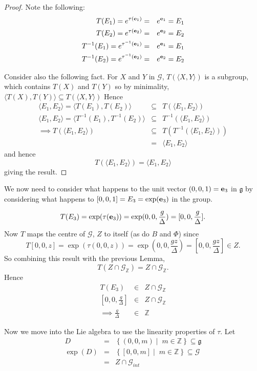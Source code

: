 \documentclass[honours]{UNSWthesis}
\newcommand{\Z}{\mathbb{Z}}
\newcommand{\G}{\mathcal{G}}
\newcommand{\g}{\mathfrak{g}}
\newcommand{\1}{\mathbf{e}_{1}}
\newcommand{\2}{\mathbf{e}_{3}}
\newcommand{\3}{\mathbf{e}_{3}}
\begin{document}
\begin{proof}
Note the following:
\begin{eqnarray*}
T(E_{1})= e^{\tau ({\bf e}_{1})} &=& e^{{\bf e}_{1}} = E_{1} \\
T(E_{2})= e^{\tau ({\bf e}_{2})} &=& e^{{\bf e}_{2}} = E_{2} \\
T^{-1}(E_{1})= e^{\tau^{-1} ({\bf e}_{1})} &=& e^{{\bf e}_{1}} = E_{1} \\
T^{-1}(E_{2})= e^{\tau^{-1} ({\bf e}_{2})} &=& e^{{\bf e}_{2}} = E_{2} 
\end{eqnarray*}

Consider also the following fact. For $X$ and $Y$ in $\G$, $T( \langle X,Y \rangle )$ is a subgroup, which contains $T(X)$ and $T(Y)$ so by minimality, $\langle T(X),T(Y) \rangle \subseteq T( \langle X,Y \rangle )$
Hence
\begin{eqnarray*}
\langle E_{1},E_{2} \rangle = \langle T(E_{1}),T(E_{2}) \rangle &\subseteq & T( \langle E_{1},E_{2} \rangle) \\
\langle E_{1},E_{2} \rangle = \langle T^{-1}(E_{1}),T^{-1}(E_{2}) \rangle & \subseteq & T^{-1}( \langle E_{1},E_{2} \rangle) \\
\implies T( \langle E_{1},E_{2} \rangle) & \subseteq & T(T^{-1}( \langle E_{1},E_{2} \rangle))\\
&=&\langle E_{1},E_{2} \rangle
\end{eqnarray*}
and hence 
\[
T( \langle E_{1},E_{2} \rangle)= \langle E_{1},E_{2}\rangle
\]
giving the result.
\end{proof}

We now need to consider what happens to the unit vector $(0,0,1)={\bf e}_{3}$ in $\g$ by considering what happens to $[0,0,1]=E_{3}=\exp({\bf e}_{3})$ in the group.

\[
T(E_{3})= \exp(\tau ({\bf e}_{3}))=\exp(0,0,\frac{g}{\Delta})=[0,0,\frac{g}{\Delta}].
\]
Now $T$ maps the centre of $\G$, $Z$ to itself (as do $B$ and $\Phi$) since 
\[
T[0,0,z]= \exp(\tau(0,0,z))= \exp(0,0,\frac{gz}{\Delta})=[0,0,\frac{gz}{\Delta}] \in Z
.\] So combining this result with the previous Lemma,
\[
T( Z \cap \G_{\Z})=Z \cap \G_{\Z}
.\]
Hence 
\begin{eqnarray*}
T(E_{3}) &\in & Z \cap \G_{\Z} \\
\left[ 0,0,\frac{g}{\Delta} \right] &\in & Z \cap \G_{\Z} \\
\implies \frac{g}{\Delta} &\in & \Z
\end{eqnarray*}

Now we move into the Lie algebra to use the linearity properties of $\tau$.
Let 
\begin{eqnarray*}
D &=& \left\lbrace (0,0,m)\; \big| \;\; m \in \Z \right\rbrace \subseteq \g \\
\exp (D) &=& \left\lbrace [0,0,m] \; \big| \;\; m \in \Z \right\rbrace \subseteq \G \\
&=& Z \cap \G_{int}
\end{eqnarray*}
\end{document}
